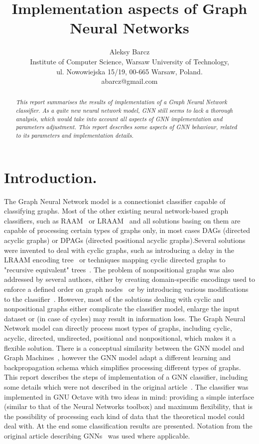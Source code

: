 \documentclass[a4paper, 11pt, twocolumn]{spie}  %
\title{Implementation aspects of Graph Neural Networks}
\author{
Aleksy Barcz\\
{\normalsize Institute of Computer Science, Warsaw University of Technology,\\
ul. Nowowiejska 15/19, 00-665 Warsaw, Poland.\\
abarcz@gmail.com}
}
\begin{document}
 
\maketitle 

\begin{abstract}
\emph{This report summarises the results of implementation of a Graph Neural Network~\cite{scarselli2009graph} classifier. As a quite new neural network model, GNN still seems to lack a thorough analysis, which would take into account all aspects of GNN implementation and parameters adjustment. This report describes some aspects of GNN behaviour, related to its parameters and implementation details.}
\end{abstract}



\section{Introduction.}
The Graph Neural Network model is a connectionist classifier capable of classifying graphs. Most of the other existing neural network-based graph classifiers, such as RAAM~\cite{pollack1990recursive} or  LRAAM~\cite{sperduti1994labelling} and all solutions basing on them are capable of processing certain types of graphs only, in most cases DAGs (directed acyclic graphs) or DPAGs (directed positional acyclic graphs).Several solutions were invented to deal with cyclic graphs, such as introducing a delay in the LRAAM encoding tree~\cite{goulon2005hopfield} or techniques mapping cyclic directed graphs to "recursive equivalent" trees~\cite{bianchini2003backpropagation}. The problem of nonpositional graphs was also addressed by several authors, either by creating domain-specific encodings used to enforce a defined order on graph nodes~\cite{ivanciuc2003canonical} or by introducing various modifications to the classifier~\cite{bianchini2005recursive}. However, most of the solutions dealing with cyclic and nonpositional graphs either complicate the classifier model, enlarge the input dataset or (in case of cycles) may result in information loss. The Graph Neural Network model can directly process most types of graphs, including cyclic, acyclic, directed, undirected, positional and nonpositional, which makes it a flexible solution. There is a conceptual similarity between the GNN model and Graph Machines~\cite{goulon2005learning}, however the GNN model adapt a different learning and backpropagation schema which simplifies processing different types of graphs. This report describes the steps of implementation of a GNN classifier, including some details which were not described in the original article~\cite{scarselli2009graph}. The classifier was implemented in GNU Octave with two ideas in mind: providing a simple interface (similar to that of the Neural Networks toolbox) and maximum flexibility, that is the possibility of processing each kind of data that the theoretical model could deal with. At the end some classification results are presented. Notation from the original article describing GNNs~\cite{scarselli2009graph} was used where applicable.
\end{document}
